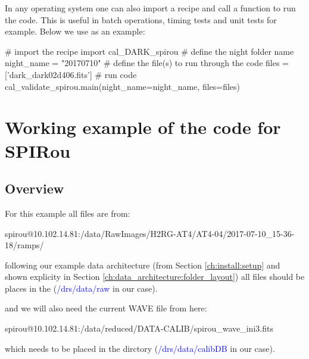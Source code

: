 In any operating system one can also import a recipe and call a function to run the code. This is useful in batch operations, timing tests and unit tests for example. Below we use \calDARK as an example:

\begin{pythonbox}
# import the recipe
import cal_DARK_spirou
# define the night folder name
night_name = "20170710"
# define the file(s) to run through the code
files = ['dark_dark02d406.fits']
# run code
cal_validate_spirou.main(night_name=night_name, files=files)
\end{pythonbox}

\clearpage
\newpage
\section{Working example of the code for SPIRou}
\label{chapter:using_the_drs:working_example}

\subsection{Overview}
\label{chapter:using_the_drs:working_example:overview}

For this example all files are from:
\begin{cmdbox}
spirou@10.102.14.81:/data/RawImages/H2RG-AT4/AT4-04/2017-07-10_15-36-18/ramps/
\end{cmdbox} 

\noindent following our example data architecture (from Section \ref{ch:install:setup} and shown explicity in Section \ref{ch:data_architecture:folder_layout}) all files should be places in the  (\textcolor{blue}{/drs/data/raw} in our case).

\noindent and we will also need the current WAVE file from here:
\begin{cmdbox}
spirou@10.102.14.81:/data/reduced/DATA-CALIB/spirou_wave_ini3.fits
\end{cmdbox}

\noindent which needs to be placed in the  dirctory (\textcolor{blue}{/drs/data/calibDB} in our case).

